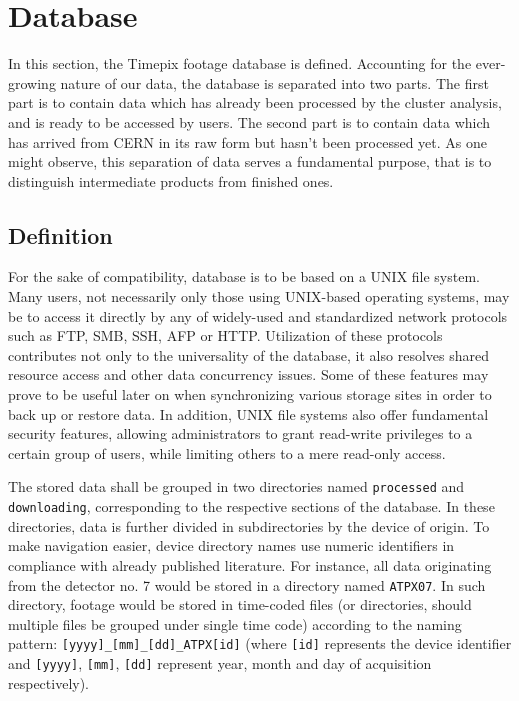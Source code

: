 \section{Database}
\label{db:definition}
In this section, the Timepix footage database is defined. Accounting for the ever-growing nature of our data, the database is separated into two parts. The first part is to contain data which has already been processed by the cluster analysis, and is ready to be accessed by users. The second part is to contain data which has arrived from CERN in its raw form but hasn't been processed yet. As one might observe, this separation of data serves a fundamental purpose, that is to distinguish intermediate products from finished ones.


\subsection{Definition}
For the sake of compatibility, database is to be based on a UNIX file system. Many users, not necessarily only those using UNIX-based operating systems, may be to access it directly by any of widely-used and standardized network protocols such as FTP, SMB, SSH, AFP or HTTP\label{db:supported-protocols}. Utilization of these protocols contributes not only to the universality of the database, it also resolves shared resource access and other data concurrency issues. Some of these features may prove to be useful later on when synchronizing various storage sites in order to back up or restore data. In addition, UNIX file systems also offer fundamental security features, allowing administrators to grant read-write privileges to a certain group of users, while limiting others to a mere read-only access.

The stored data shall be grouped in two directories named \texttt{processed} and \texttt{downloading}, corresponding to the respective sections of the database. In these directories, data is further divided in subdirectories by the device of origin. To make navigation easier, device directory names use numeric identifiers in compliance with already published literature. For instance, all data originating from the detector no. 7 would be stored in a directory named \texttt{ATPX07}. In such directory, footage would be stored in time-coded files (or directories, should multiple files be grouped under single time code) according to the naming pattern: \texttt{[yyyy]\_[mm]\_[dd]\_ATPX[id]} (where \texttt{[id]} represents the device identifier and \texttt{[yyyy]}, \texttt{[mm]}, \texttt{[dd]} represent year, month and day of acquisition respectively).

